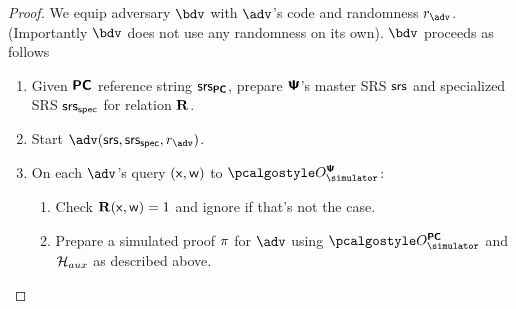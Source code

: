 \documentclass[runningheads,11pt]{llncs}
\begin{document}
\begin{proof}
We equip adversary $\bdv$ with $\adv$'s code and randomness
  $\radv$. (Importantly $\bdv$ does not use any randomness on its
  own). $\bdv$ proceeds as follows
  \begin{enumerate}
  \item Given $\bm{\mathsf{PC}}$ reference string $\mathsf{srs}_{\bm{\mathsf{PC}}}$, prepare $\bm{\mathsf{\Psi}}$'s master
    SRS $\mathsf{srs}$ and specialized SRS $\mathsf{srs_{spec}}$ for relation $\mathbf{R}$.
  \item Start $\adv(\srs, \srss, \radv)$.
    \item On each $\adv$'s query $(\mathsf{x}, \mathsf{w})$ to $\oraclesps$:
    \begin{enumerate}
    \item Check $\mathbf{R}(\mathsf{x}, \mathsf{w}) = 1$ and ignore if that's not the case.
      \item Prepare a simulated proof $\pi$ for $\adv$ using $\oraclespcom$ and $\mathcal{H}_{aux}$ as described above.


\end{enumerate}
\end{enumerate}
\end{proof}
\end{document}
